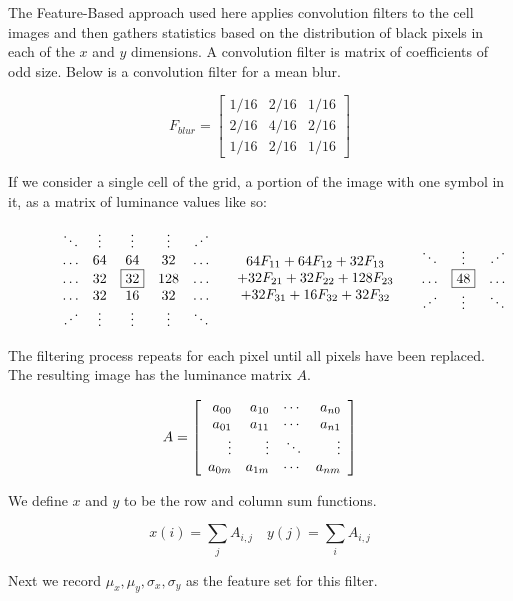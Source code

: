 The Feature-Based approach used here applies convolution filters to the cell images and then
gathers statistics based on the distribution of black pixels in each of the $x$ and $y$ dimensions.
A convolution filter is matrix of coefficients of odd size. Below is a convolution filter for a
mean blur.

\[ F_{blur} = \left[
\begin{array}{ccc}
1/16 & 2/16 & 1/16 \\
2/16 & 4/16 & 2/16 \\
1/16 & 2/16 & 1/16
\end{array}\right] \]

If we consider a single cell of the grid, a portion of the image with one symbol in it, as a matrix
of luminance values like so:

\begin{figure} \[
\begin{array}{lcr}
\begin{array}{ccccc}
\ddots & \vdots & \vdots & \vdots & \iddots \\
\ldots & 64 & 64 & 32 & \ldots \\
\ldots & 32 & \fbox{32} & 128 & \ldots \\
\ldots & 32 & 16 & 32 & \ldots \\
\iddots & \vdots & \vdots & \vdots & \ddots \\
\end{array} &
\begin{array}{c}
64F_{11} + 64F_{12} + 32F_{13} \\
+ 32F_{21} + 32F_{22} + 128F_{23} \\
+ 32F_{31} + 16F_{32} + 32F_{32} \\
\end{array} &
\begin{array}{ccccc}
\ddots & \vdots & \iddots \\
\ldots &  \fbox{48}  & \ldots \\
\iddots & \vdots & \ddots \\
\end{array}
\end{array} \]
\end{figure}

The filtering process repeats for each pixel until all pixels have been replaced.
The resulting image has the luminance matrix $A$.

\[A = \left [
    \begin{array}{r r r r}
        a_{00} & a_{10} & \cdots & a_{n0} \\
        a_{01} & a_{11} & \cdots & a_{n1}\\
        \vdots  & \vdots  & \ddots & \vdots\\
        a_{0m} & a_{1m} & \cdots & a_{nm}\\
    \end{array}
\right ] \]

We define $x$ and $y$ to be the row and column sum functions.

\begin{equation}
x(i) = \sum_{j}{A_{i,j}} \quad
y(j) = \sum_{i}{A_{i,j}}
\end{equation}

Next we record $\mu_x, \mu_y, \sigma_x, \sigma_y$ as the feature set for this filter.

